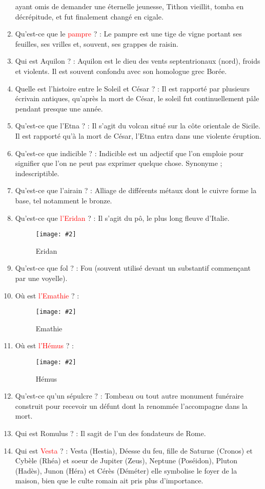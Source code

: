 \documentclass[a4paper, 11pt, hidelinks]{article}
\newcommand{\img}[4]{\begin{figure}[!ht]
    \centering
    \texttt{[image: \#2]}
    \caption{#3}
    \label{#4}
    \end{figure} }
\begin{document}
\begin{enumerate}
            ayant omis de demander une éternelle jeunesse, Tithon vieillit, tomba en décrépitude, et fut finalement changé en cigale.
      \item Qu'est-ce que le \textcolor{red}{pampre} ? : Le pampre est une tige de vigne portant ses feuilles, ses vrilles et, souvent, ses grappes de raisin.
      \item Qui est Aquilon ? : Aquilon est le dieu des vents septentrionaux (nord), froids et violents. Il est souvent confondu avec son homologue grec Borée.
      \item Quelle est l'histoire entre le Soleil et César ? : Il est rapporté par plusieurs écrivain antiques, qu'après la mort de César, le soleil fut
            continuellement pâle pendant presque une année.
      \item Qu'est-ce que l'Etna ? : Il s'agit du volcan situé sur la côte orientale de Sicile. Il est rapporté qu'à la mort de César, l'Etna entra dans une
            violente éruption.
      \item Qu'est-ce que indicible ? : Indicible est un adjectif que l’on emploie pour signifier que l’on ne peut pas exprimer quelque chose. Synonyme ; indescriptible.
      \item Qu'est-ce que l'airain ? : Alliage de différents métaux dont le cuivre forme la base, tel notamment le bronze.
      \item Qu'est-ce que \textcolor{red}{l'Eridan} ? : Il s'agit du pô, le plus long fleuve d'Italie.
            \img{0.5}{Eridan.jpg}{Eridan}{47}
      \item Qu'est-ce que fol ? : Fou (souvent utilisé devant un substantif commençant par une voyelle).
      \item Où est \textcolor{red}{l'Emathie} ? :
            \img{0.3}{Emathie.png}{Emathie}{48}
      \item Où est \textcolor{red}{l'Hémus} ? :
            \img{0.3}{Hémus.png}{Hémus}{49}
      \item Qu'est-ce qu'un sépulcre ? : Tombeau ou tout autre monument funéraire construit pour recevoir un défunt dont la renommée l'accompagne dans la mort.
      \item Qui est Romulus ? : Il sagit de l'un des fondateurs de Rome.
      \item Qui est \textcolor{red}{Vesta} ? : Vesta (Hestia), Déesse du feu, fille de Saturne (Cronos) et Cybèle (Rhéa) et soeur de Jupiter (Zeus), Neptune (Poséidon), Pluton (Hadès), Junon (Héra) et
            Cérès (Déméter) elle symbolise le foyer de la maison, bien que le culte romain ait pris plus d’importance.

\end{enumerate}
\end{document}
